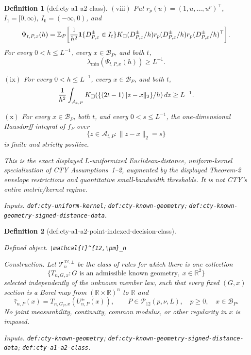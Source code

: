 \documentclass{article}
\newtheorem{definition}{Definition}
\begin{document}
\begin{definition}[def:cty-a1-a2-class]
\(\mathrm{(viii)}\) Put \(r_p(u)=(1,u,\ldots,u^p)^\top\), \(I_1=[0,\infty)\), \(I_0=(-\infty,0)\), and
\[
 \Psi_{t,P,x}(h)=\mathbb E_P\!\left[
 {1\over h^2}\mathbf 1\{D^{\pm}_{P,x}\in I_t\}K_\square(D^{\pm}_{P,x}/h)
 r_p(D^{\pm}_{P,x}/h)r_p(D^{\pm}_{P,x}/h)^\top
 \right].
\]
For every \(0<h\leq L^{-1}\), every \(x\in\mathcal B_P\), and both \(t\),
\[
 \lambda_{\min}(\Psi_{t,P,x}(h))\geq L^{-1}.
\]

\(\mathrm{(ix)}\) For every \(0<h\leq L^{-1}\), every \(x\in\mathcal B_P\), and both \(t\),
\[
 {1\over h^2}\int_{\mathcal A_{t,P}}
 K_\square(\{(2t-1)\lVert z-x\rVert_2\}/h)\,dz\geq L^{-1}.
\]

\(\mathrm{(x)}\) For every \(x\in\mathcal B_P\), both \(t\), and every \(0<s\leq L^{-1}\), the one-dimensional Hausdorff integral of \(f_P\) over
\[
 \{z\in\mathcal A_{t,P}:\lVert z-x\rVert_2=s\}
\]
is finite and strictly positive.

This is the exact displayed \(L\)-uniformized Euclidean-distance, uniform-kernel specialization of CTY Assumptions~1--2, augmented by the displayed Theorem-2 envelope restrictions and quantitative small-bandwidth thresholds.  It is not CTY's entire metric/kernel regime.
\par\smallskip\noindent\emph{Inputs.} \texttt{def:\allowbreak{}cty-\allowbreak{}uniform-\allowbreak{}kernel}; \texttt{def:\allowbreak{}cty-\allowbreak{}known-\allowbreak{}geometry}; \texttt{def:\allowbreak{}cty-\allowbreak{}known-\allowbreak{}geometry-\allowbreak{}signed-\allowbreak{}distance-\allowbreak{}data}.
\end{definition}

\begin{definition}[def:cty-a1-a2-point-indexed-decision-class]\label{def:cty-a1-a2-point-indexed-decision-class}
\par\smallskip\noindent\emph{Defined object.} \texttt{\textbackslash{}\allowbreak{}mathcal\{T\}\allowbreak{}\textasciicircum{}\{12,\allowbreak{}\textbackslash{}\allowbreak{}pm\}\allowbreak{}\_\allowbreak{}n}
\par\smallskip\noindent\emph{Construction.} Let \(\mathcal T^{12,\pm}_n\) be the class of rules for which there is one collection
\[
 \{T_{n,G,x}:G\text{ is an admissible known geometry},\ x\in\mathbb R^2\}
\]
selected independently of the unknown member law, such that every fixed \((G,x)\) section is a Borel map from \((\mathbb R\times\mathbb R)^n\) to \(\mathbb R\) and
\[
 \widehat\tau_{n,P}(x)=T_{n,G_P,x}(U^{\pm}_{n,P}(x)),
 \qquad P\in\mathcal P_{12}(p,\nu,L),\quad p\geq0,\quad x\in\mathcal B_P.
\]
No joint measurability, continuity, common modulus, or other regularity in \(x\) is imposed.
\par\smallskip\noindent\emph{Inputs.} \texttt{def:\allowbreak{}cty-\allowbreak{}known-\allowbreak{}geometry}; \texttt{def:\allowbreak{}cty-\allowbreak{}known-\allowbreak{}geometry-\allowbreak{}signed-\allowbreak{}distance-\allowbreak{}data}; \texttt{def:\allowbreak{}cty-\allowbreak{}a1-\allowbreak{}a2-\allowbreak{}class}.
\end{definition}
\end{document}
